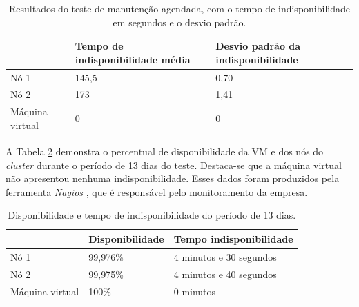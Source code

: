 
\begin{table}[h!]
\caption{Resultados do teste de manutenção agendada, com o tempo de indisponibilidade em segundos e o desvio padrão.}
\small
\label{tab:teste3resultados}
\begin{center}
\begin{tabular}{|l|p{5.5cm}|p{5.5cm}|}\hline
 & \textbf{Tempo de indisponibilidade média} & \textbf{Desvio padrão da indisponibilidade} \\\hline
Nó 1 & 145,5 & 0,70 \\\hline
Nó 2 & 173 & 1,41 \\\hline
Máquina virtual & 0 & 0 \\\hline
\end{tabular}
\end{center}
\end{table}

A Tabela \ref{tab:teste3disp} demonstra o percentual de disponibilidade da \ac{VM} e dos nós do \textit{cluster} durante o período de 13 dias
do teste. Destaca-se que a máquina virtual não apresentou nenhuma indisponibilidade. 
Esses dados foram produzidos pela ferramenta \textit{Nagios} \cite{nagios}, que é responsável pelo monitoramento da empresa.

\begin{table}[h!]
\caption{Disponibilidade e tempo de indisponibilidade do período de 13 dias.}
\small
\label{tab:teste3disp}
\begin{center}
\begin{tabular}{|l|p{5.5cm}|p{5.5cm}|}\hline
 & \textbf{Disponibilidade} & \textbf{Tempo indisponibilidade} \\\hline
Nó 1 & 99,976\% & 4 minutos e 30 segundos \\\hline
Nó 2 & 99,975\% & 4 minutos e 40 segundos \\\hline
Máquina virtual & 100\% & 0 minutos \\\hline
\end{tabular}
\end{center}
\end{table}

